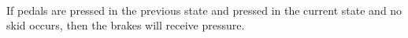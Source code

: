 \begin{tt}
\ \\ 
If pedals are pressed in the previous state and pressed in the current state and no skid occurs, then the brakes will receive pressure. \\ 
\end{tt}


















